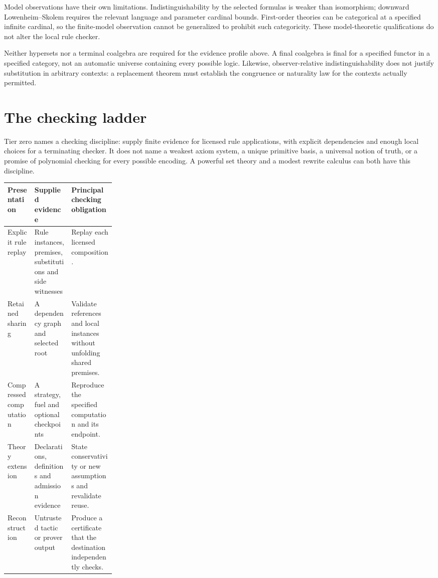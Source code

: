 \documentclass[11pt,a4paper]{article}
\theoremstyle{plain}
\theoremstyle{definition}
\theoremstyle{remark}
\begin{document}
Model observations have their own limitations. Indistinguishability by the
selected formulas is weaker than isomorphism; downward Lowenheim--Skolem
requires the relevant language and parameter cardinal bounds. First-order
theories can be categorical at a specified infinite cardinal, so the
finite-model observation cannot be generalized to prohibit such categoricity.
These model-theoretic qualifications do not alter the local rule checker.

Neither hypersets nor a terminal coalgebra are required for the evidence
profile above. A final coalgebra is final for a specified functor in a
specified category, not an automatic universe containing every possible
logic. Likewise, observer-relative indistinguishability does not justify
substitution in arbitrary contexts: a replacement theorem must establish the
congruence or naturality law for the contexts actually permitted.

\section{The checking ladder}\label{sec:ladder}

Tier zero names a checking discipline: supply finite evidence for licensed
rule applications, with explicit dependencies and enough local choices for a
terminating checker. It does not name a weakest axiom system, a unique primitive
basis, a universal notion of truth, or a promise of polynomial checking for
every possible encoding. A powerful set theory and a modest rewrite calculus
can both have this discipline.

\begin{center}\small
\begin{tabularx}{\linewidth}{@{}>{\raggedright\arraybackslash}p{0.25\linewidth}>{\raggedright\arraybackslash}X>{\raggedright\arraybackslash}X@{}}
\toprule
Presentation & Supplied evidence & Principal checking obligation \\
\midrule
Explicit rule replay & Rule instances, premises, substitutions and side witnesses & Replay each licensed composition. \\
Retained sharing & A dependency graph and selected root & Validate references and local instances without unfolding shared premises. \\
Compressed computation & A strategy, fuel and optional checkpoints & Reproduce the specified computation and its endpoint. \\
Theory extension & Declarations, definitions and admission evidence & State conservativity or new assumptions and revalidate reuse. \\
Reconstruction & Untrusted tactic or prover output & Produce a certificate that the destination independently checks. \\
\bottomrule
\end{tabularx}
\end{center}
\end{document}
